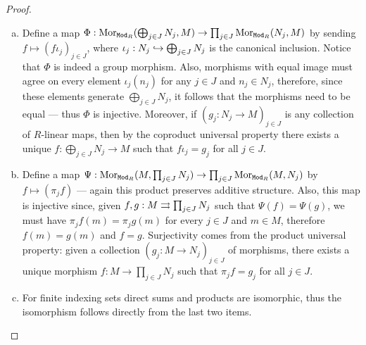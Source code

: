 \begin{proof}
\begin{enumerate}[(a)]\setlength\itemsep{0em}
\item Define a map
  \(\Phi: \operatorname{Mor}_{{\texttt{Mod}_{R}}}(\bigoplus_{j \in J} N_j, M) \to \prod_{j \in J}
  \operatorname{Mor}_{{\texttt{Mod}_{R}}}(N_j, M)\) by sending \(f \mapsto (f \iota_j)_{j \in J}\),
  where \(\iota_j: N_j \hookrightarrow \bigoplus_{j \in J} N_j\) is the canonical
  inclusion. Notice that \(\Phi\) is indeed a group morphism. Also, morphisms
  with equal image must agree on every element \(\iota_j(n_j)\) for any
  \(j \in J\) and \(n_j \in N_j\), therefore, since these elements generate
  \(\bigoplus_{j \in J} N_j\), it follows that the morphisms need to be equal
  --- thus \(\Phi\) is injective. Moreover, if \((g_j: N_j \to M)_{j \in J}\) is
  any collection of \(R\)-linear maps, then by the coproduct universal property
  there exists a unique \(f: \bigoplus_{j \in J} N_j \to M\) such that
  \(f \iota_j = g_j\) for all \(j \in J\).

\item Define a map
  \(\Psi: \operatorname{Mor}_{{\texttt{Mod}_{R}}}(M, \prod_{j \in J} N_j) \to \prod_{j \in J}
  \operatorname{Mor}_{{\texttt{Mod}_{R}}}(M, N_j)\) by \(f \mapsto (\pi_j f)\) --- again
  this product preserves additive structure. Also, this map is injective since,
  given \(f, g: M \rightrightarrows \prod_{j \in J} N_j\) such that \(\Psi(f) = \Psi(g)\),
  we must have \(\pi_j f(m) = \pi_j g(m)\) for every \(j \in J\) and
  \(m \in M\), therefore \(f(m) = g(m)\) and \(f = g\). Surjectivity comes from
  the product universal property: given a collection
  \((g_j: M \to N_j)_{j \in J}\) of morphisms, there exists a unique morphism
  \(f: M \to \prod_{j \in J} N_j\) such that \(\pi_j f = g_j\) for all
  \(j \in J\).

\item For finite indexing sets direct sums and products are isomorphic, thus the
  isomorphism follows directly from the last two items.
\end{enumerate}
\end{proof}

